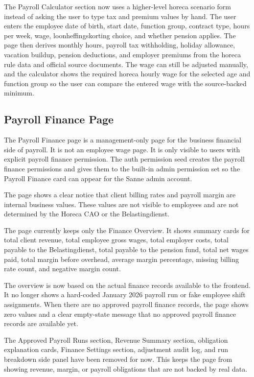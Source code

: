 \documentclass[11pt]{article}
\begin{document}
The Payroll Calculator section now uses a higher-level horeca scenario form instead of asking the user to type tax and premium values by hand. The user enters the employee date of birth, start date, function group, contract type, hours per week, wage, loonheffingskorting choice, and whether pension applies. The page then derives monthly hours, payroll tax withholding, holiday allowance, vacation buildup, pension deductions, and employer premiums from the horeca rule data and official source documents. The wage can still be adjusted manually, and the calculator shows the required horeca hourly wage for the selected age and function group so the user can compare the entered wage with the source-backed minimum.
\subsection{Payroll Finance Page}

The Payroll Finance page is a management-only page for the business financial side of payroll. It is not an employee wage page. It is only visible to users with explicit payroll finance permission. The auth permission seed creates the payroll finance permissions and gives them to the built-in admin permission set so the Payroll Finance card can appear for the Sanne admin account.

The page shows a clear notice that client billing rates and payroll margin are internal business values. These values are not visible to employees and are not determined by the Horeca CAO or the Belastingdienst.

The page currently keeps only the Finance Overview. It shows summary cards for total client revenue, total employee gross wages, total employer costs, total payable to the Belastingdienst, total payable to the pension fund, total net wages paid, total margin before overhead, average margin percentage, missing billing rate count, and negative margin count.

The overview is now based on the actual finance records available to the frontend. It no longer shows a hard-coded January 2026 payroll run or fake employee shift assignments. When there are no approved payroll finance records, the page shows zero values and a clear empty-state message that no approved payroll finance records are available yet.

The Approved Payroll Runs section, Revenue Summary section, obligation explanation cards, Finance Settings section, adjustment audit log, and run breakdown side panel have been removed for now. This keeps the page from showing revenue, margin, or payroll obligations that are not backed by real data.
\end{document}
